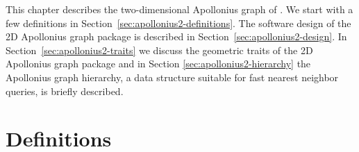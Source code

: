 
This chapter describes the two-dimensional Apollonius graph
of \cgal. We start with a few definitions in 
Section~\ref{sec:apollonius2-definitions}.
The software design of the 2D Apollonius graph package is described 
in Section~\ref{sec:apollonius2-design}.
In Section~\ref{sec:apollonius2-traits} we discuss the geometric
traits of the 2D Apollonius graph package and in Section
\ref{sec:apollonius2-hierarchy} the Apollonius graph hierarchy, a data
structure suitable for fast nearest neighbor queries, is briefly
described.


\section{Definitions\label{sec:apollonius2-definitions}}

